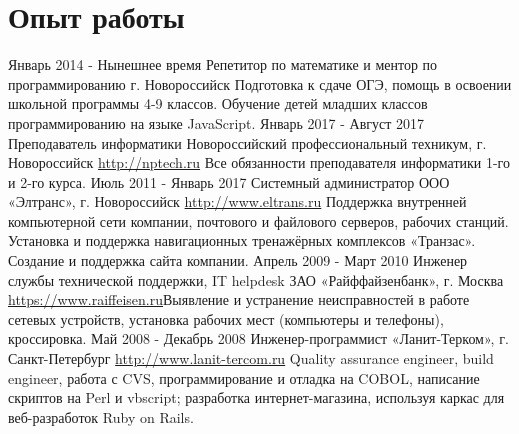 \documentclass[11pt,a4paper]{moderncv}
\begin{document}
\maketitle

\section{Опыт работы}
\cventry
  {Январь 2014 - Нынешнее время}
  {Репетитор по математике и ментор по программированию}
  {г. Новороссийск}
  {}{}{Подготовка к сдаче ОГЭ, помощь  в освоении школьной программы 
  4-9 классов.\newline{} 
  Обучение детей младших классов программированию на языке JavaScript.\newline{}}
  \cventry
    {Январь 2017 - Август 2017}
    {Преподаватель информатики}
    {Новороссийский профессиональный техникум,\newline{} г. Новороссийск}
    {\url{http://nptech.ru}}{}
    {Все обязанности преподавателя информатики 1-го и 2-го курса.\newline{}}
  \cventry
  {Июль 2011 - Январь 2017}
  {Системный администратор}
  {ООО «Элтранс», г. Новороссийск}
  {\newline{}\url{http://www.eltrans.ru}}{}
  {Поддержка внутренней компьютерной сети компании, почтового и файлового \newline{}серверов, 
  рабочих станций. Установка и поддержка навигационных тренажёрных \newline{}комплексов 
  «Транзас». Создание и поддержка сайта компании.\newline{}}
\cventry
  {Апрель 2009 - Март 2010}
  {Инженер службы технической поддержки, IT helpdesk}
  {ЗАО «Райффайзенбанк», г. Москва}
  {\url{https://www.raiffeisen.ru}}{}{Выявление и устранение неисправностей в работе сетевых 
  устройств, установка рабочих мест (компьютеры и телефоны), кроссировка.\newline{}}
\cventry
  {Май 2008 - Декабрь 2008}
  {Инженер-программист}
  {«Ланит-Терком», г. Санкт-Петербург}
  {\newline{}\url{http://www.lanit-tercom.ru}}{}
  {Quality assurance engineer, build engineer, работа с CVS, программирование и отладка на COBOL, 
  написание скриптов на Perl и vbscript;\newline{}
   разработка интернет-магазина, используя каркас для веб-разработок Ruby on Rails.}
\end{document}

